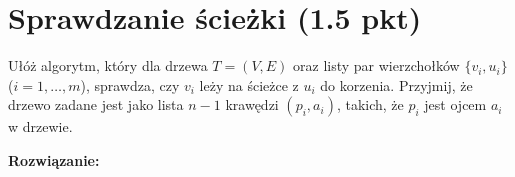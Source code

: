\documentclass[12pt]{article}
\begin{document}
\section{Sprawdzanie ścieżki (1.5 pkt)}

Ułóż algorytm, który dla drzewa \( T = (V, E) \) oraz listy par wierzchołków \( \{v_i, u_i\} \) (\( i = 1, \dots, m \)), sprawdza, czy \( v_i \) leży na ścieżce z \( u_i \) do korzenia. 
Przyjmij, że drzewo zadane jest jako lista \( n-1 \) krawędzi \( (p_i, a_i) \), takich, że \( p_i \) jest ojcem \( a_i \) w drzewie.

\vspace{1em}
\textcolor{tokyoNightGreen}{\textbf{\large Rozwiązanie:}}
\vspace{1em}
\end{document}
